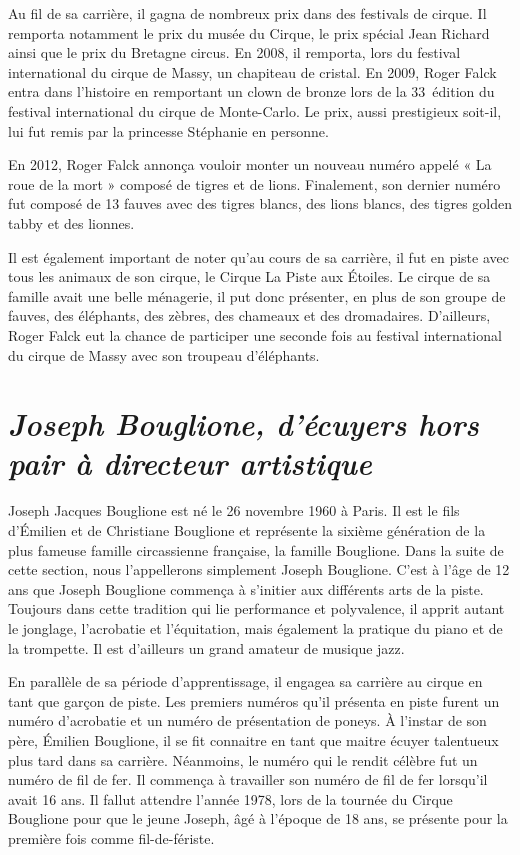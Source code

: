 Au fil de sa carrière, il gagna de nombreux prix dans des festivals de cirque. Il remporta notamment le prix du musée du Cirque, le prix spécial Jean Richard ainsi que le prix du Bretagne circus. En 2008, il remporta, lors du festival international du cirque de Massy, un chapiteau de cristal.  En 2009, Roger Falck entra dans l’histoire en remportant un clown de bronze lors de la 33\ieme~édition du festival international du cirque de Monte-Carlo. Le prix, aussi prestigieux soit-il, lui fut remis par la princesse Stéphanie en personne.

En 2012, Roger Falck annonça vouloir monter un nouveau numéro appelé « La roue de la mort » composé de tigres et de lions. Finalement, son dernier numéro fut composé de 13 fauves avec des tigres blancs, des lions blancs, des tigres golden tabby et des lionnes.

Il est également important de noter qu’au cours de sa carrière, il fut en piste avec tous les animaux de son cirque, le Cirque La Piste aux Étoiles. Le cirque de sa famille avait une belle ménagerie, il put donc présenter, en plus de son groupe de fauves, des éléphants, des zèbres, des chameaux et des dromadaires. D’ailleurs, Roger Falck eut la chance de participer une seconde fois au festival international du cirque de Massy avec son troupeau d’éléphants.

\section*{\textit{Joseph Bouglione, d’écuyers hors pair à directeur artistique}}
{}
Joseph Jacques Bouglione est né le 26 novembre 1960 à Paris. Il est le fils d'Émilien et de Christiane Bouglione et représente la sixième génération de la plus fameuse famille circassienne française, la famille Bouglione. Dans la suite de cette section, nous l’appellerons simplement Joseph Bouglione. C’est à l’âge de 12 ans que Joseph Bouglione commença à s’initier aux différents arts de la piste. Toujours dans cette tradition qui lie performance et polyvalence, il apprit autant le jonglage, l’acrobatie et l’équitation, mais également la pratique du piano et de la trompette. Il est d’ailleurs un grand amateur de musique jazz.

En parallèle de sa période d’apprentissage, il engagea sa carrière au cirque en tant que garçon de piste. Les premiers numéros qu’il présenta en piste furent un numéro d’acrobatie et un numéro de présentation de poneys. À l’instar de son père, Émilien Bouglione, il se fit connaitre en tant que maitre écuyer talentueux plus tard dans sa carrière. Néanmoins, le numéro qui le rendit célèbre fut un numéro de fil de fer. Il commença à travailler son numéro de fil de fer lorsqu’il avait 16 ans. Il fallut attendre l’année 1978, lors de la tournée du Cirque Bouglione pour que le jeune Joseph, âgé à l’époque de 18 ans, se présente pour la première fois comme fil-de-fériste.

